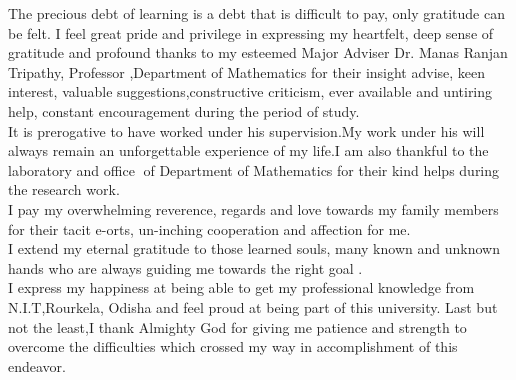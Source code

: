 \documentclass[12pt]{report}
\begin{document}
   \begin{flushleft}
   	The precious debt of learning is a debt that is difficult to pay, only gratitude can be felt. I feel great pride and privilege in expressing my heartfelt, deep sense of gratitude and profound thanks to my esteemed Major Adviser Dr. Manas Ranjan Tripathy, Professor ,Department of Mathematics for their insight advise, keen interest, valuable suggestions,constructive criticism, ever available and untiring help, constant encouragement during
   the period of study.\\
   It is prerogative to have worked under his supervision.My work under his will always remain an unforgettable experience of my life.I am also thankful to the laboratory and office of Department of Mathematics for their kind helps during the research work.\\
    I pay my overwhelming reverence, regards and love towards my family members for their tacit e-orts, un-inching cooperation and affection for me.\\
    I extend my eternal gratitude to those learned souls, many known and unknown hands who are always guiding me towards the right goal .\\
    I express my happiness at being able to get my professional knowledge from N.I.T,Rourkela, Odisha and feel proud at being part of this university. Last but not the least,I thank Almighty God for giving me patience and strength to overcome the difficulties which crossed my way in accomplishment of this endeavor.\\
   \end{flushleft}
    
\end{document}
